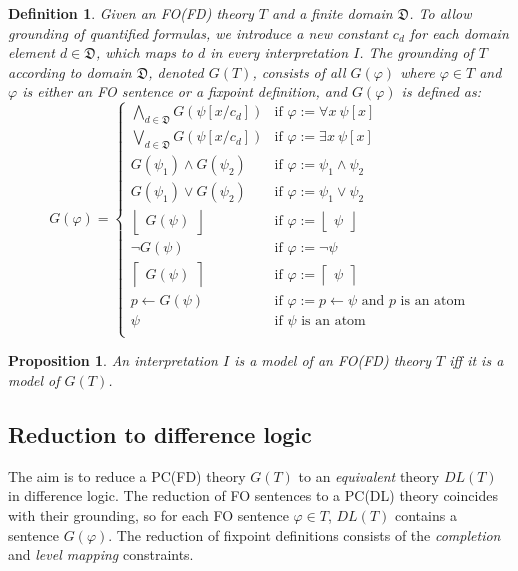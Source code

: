 \documentclass{tlp}
\newcommand{\rul}{\leftarrow}
\newcommand{\gt}{G(T)}
\newcommand{\dlt}{DL(T)}
\newcommand{\lfd}[1]{\ensuremath{\left \lfloor \begin{array}{l}#1\end{array} \right \rfloor }}
\newcommand{\gfd}[1]{\ensuremath{\left \lceil \begin{array}{l}#1\end{array} \right \rceil}}
\newtheorem{proposition}[lemma]{Proposition}
\newtheorem{definition}[lemma]{Definition}
\begin{document}
\begin{definition}
Given an FO(FD) theory $T$ and a finite domain $\mathfrak{D}$. To allow grounding of quantified formulas, we introduce a new constant $c_d$ for each domain element $d \in \mathfrak{D}$, which maps to $d$ in every interpretation $I$. The grounding of $T$ according to domain $\mathfrak{D}$, denoted $\gt$, consists of all $G(\varphi)$ where $\varphi \in T$ and $\varphi$ is either an FO sentence or a fixpoint definition, and $G(\varphi)$ is defined as:
\[
G(\varphi) =
	\begin{cases}
		\bigwedge_{d \in \mathfrak{D}} G(\psi[x/c_d]) & \text{if } \varphi := \forall x \ \psi[x] \\
		\bigvee_{d \in \mathfrak{D}} G(\psi[x/c_d]) 	& \text{if } \varphi := \exists x \ \psi[x]   \\
		G(\psi_1) \wedge G(\psi_2) 		& \text{if } \varphi := \psi_1 \wedge \psi_2\\
		G(\psi_1) \vee G(\psi_2) 		& \text{if } \varphi := \psi_1 \vee \psi_2 \\
		\lfd{G(\psi)} 					& \text{if } \varphi := \lfd{\psi}\\
		\neg G(\psi) 					& \text{if } \varphi := \neg \psi \\
		\gfd{G(\psi)}					& \text{if } \varphi := \gfd{\psi}\\
		p \rul G(\psi)					& \text{if } \varphi := p \rul \psi \text{ and $p$ is an atom} \\
		\psi 							& \text{if } \psi \text{ is an atom} \\
	\end{cases}
\]
\end{definition}

\begin{proposition}
An interpretation $I$ is a model of an FO(FD) theory $T$ iff it is a model of $\gt$.
\end{proposition}

\subsection{Reduction to difference logic}
The aim is to reduce a PC(FD) theory $\gt$ to an \emph{equivalent} theory $\dlt$ in difference logic. The reduction of FO sentences to a PC(DL) theory coincides with their grounding, so for each FO sentence $\varphi \in T$, $\dlt$ contains a sentence $G(\varphi)$. The reduction of fixpoint definitions consists of the \emph{completion} and \emph{level mapping} constraints.
\end{document}
